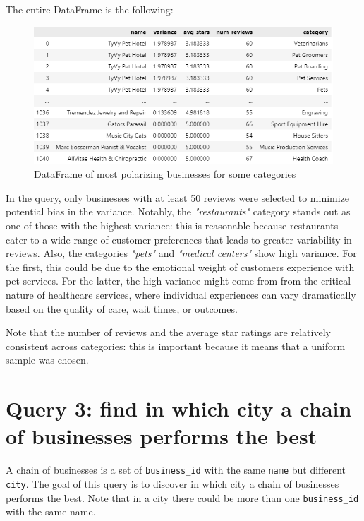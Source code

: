 \documentclass{Configuration_Files/PoliMi3i_thesis}
\begin{document}
\bigskip

The entire DataFrame is the following:

\bigskip

\begin{figure}[H]
    \centering
    \includegraphics[width=\columnwidth]{imgs/most_polarizing_businesses_table.png}
    \caption{DataFrame of most polarizing businesses for some categories}
    \label{fig:most_polarizing_businesses_table}
\end{figure}

\bigskip

In the query, only businesses with at least 50 reviews were selected to minimize potential bias in the variance. Notably, the \textit{"restaurants"} category stands out as one of those with the highest variance: this is reasonable because restaurants cater to a wide range of customer preferences that leads to greater variability in reviews. Also, the categories \textit{"pets"} and \textit{"medical centers"} show high variance. For the first, this could be due to the emotional weight of customers experience with pet services. For the latter, the high variance might come from from the critical nature of healthcare services, where individual experiences can vary dramatically based on the quality of care, wait times, or outcomes.

Note that the number of reviews and the average star ratings are relatively consistent across categories: this is important because it means that a uniform sample was chosen. 

\section{Query 3: find in which city a chain of businesses performs the best}
A chain of businesses is a set of \texttt{business\_id} with the same \texttt{name} but different \texttt{city}. The goal of this query is to discover in which city a chain of businesses performs the best. Note that in a city there could be more than one \texttt{business\_id} with the same name.
\end{document}
